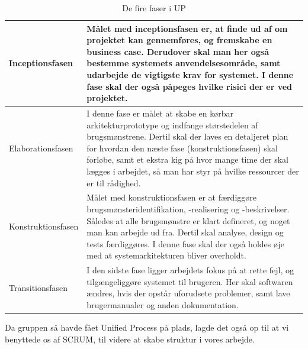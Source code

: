         \begin{table}[H]
        \centering
        \begin{tabular}{|p{35mm}|p{105mm}|}
        \hline
            Inceptionsfasen & Målet med inceptionsfasen er, at finde ud af om projektet kan gennemføres, og fremskabe en business case. Derudover skal man her også bestemme systemets anvendelsesområde, samt udarbejde de vigtigste krav for systemet. I denne fase skal der også påpeges hvilke risici der er ved projektet.
        \\ \hline
            Elaborationsfasen & I denne fase er målet at skabe en kørbar arkitekturprototype og indfange størstedelen af brugsmønstrene. Dertil skal der laves en detaljeret plan for hvordan den næste fase (konstruktionsfasen) skal forløbe, samt et ekstra kig på hvor mange time der skal lægges i arbejdet, så man har styr på hvilke ressourcer der er til rådighed.
        \\ \hline
            Konstruktionsfasen & Målet med konstruktionsfasen er at færdiggøre brugsmønsteridentifikation, -realisering og -beskrivelser. Således at alle brugsmønstre er klart defineret, og noget man kan arbejde ud fra. Dertil skal analyse, design og tests færdiggøres. I denne fase skal der også holdes øje med at systemarkitekturen bliver overholdt.
        \\ \hline
            Transitionsfasen & I den sidste fase ligger arbejdets fokus på at rette fejl, og tilgængeliggøre systemet til brugeren. Her skal softwaren ændres, hvis der opstår uforudsete problemer, samt lave brugermanualer og anden dokumentation.
        \\ \hline
        \end{tabular}
            \caption{De fire faser i UP}
            \label{tab:UP_faser}
        \end{table}
Da gruppen så havde fået Unified Process på plads, lagde det også op til at vi benyttede os af SCRUM, til videre at skabe struktur i vores arbejde. %